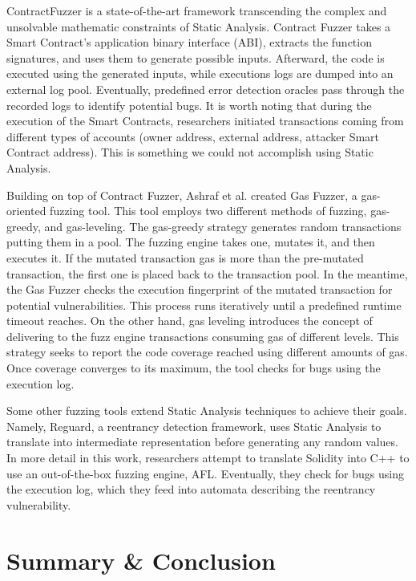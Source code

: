 \documentclass[a4paper,11pt]{article}
\begin{document}
ContractFuzzer\cite{jiang2018contractfuzzer} is a state-of-the-art framework transcending the complex and
unsolvable mathematic constraints of Static Analysis. Contract Fuzzer takes a Smart
Contract's application binary interface (ABI), extracts the function signatures,
and uses them to generate possible inputs. Afterward, the code is executed using
the generated inputs, while executions logs are dumped into an external log
pool. Eventually, predefined error detection oracles pass through the recorded
logs to identify potential bugs. It is worth noting that during the execution of
the Smart Contracts, researchers initiated transactions coming from different
types of accounts (owner address, external address, attacker Smart Contract
address). This is something we could not accomplish using Static Analysis. 

Building on top of Contract Fuzzer, Ashraf et al. created Gas Fuzzer\cite{ashraf2020gasfuzzer}, a
gas-oriented fuzzing tool. This tool employs two different methods of fuzzing,
gas-greedy, and gas-leveling. The gas-greedy strategy generates random
transactions putting them in a pool. The fuzzing engine takes one, mutates it,
and then executes it. If the mutated transaction gas is more than the
pre-mutated transaction, the first one is placed back to the transaction pool.
In the meantime, the Gas Fuzzer checks the execution fingerprint of the mutated
transaction for potential vulnerabilities. This process runs iteratively until a
predefined runtime timeout reaches. On the other hand, gas leveling introduces
the concept of delivering to the fuzz engine transactions consuming gas of
different levels. This strategy seeks to report the code coverage reached using
different amounts of gas. Once coverage converges to its maximum, the tool
checks for bugs using the execution log. 

Some other fuzzing tools extend Static Analysis techniques to achieve their goals.
Namely, Reguard\cite{liu2018reguard}, a reentrancy detection framework, uses Static Analysis to
translate into intermediate representation before generating any random values.
In more detail in this work, researchers attempt to translate Solidity into C++
to use an out-of-the-box fuzzing engine, AFL\cite{afl}. Eventually, they check for bugs
using the execution log, which they feed into automata describing the reentrancy
vulnerability.

\section{Summary \& Conclusion}
\end{document}
